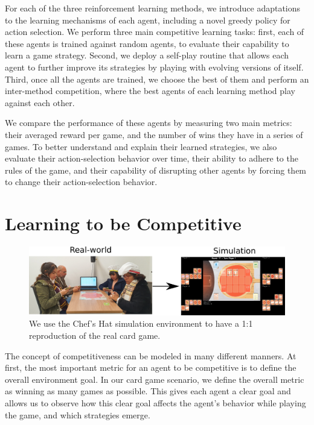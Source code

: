 \documentclass[a4paper,conference]{IEEEtran}
\begin{document}
For each of the three reinforcement learning methods, we introduce adaptations to the learning mechanisms of each agent, including a novel greedy policy for action selection. We perform three main competitive learning tasks: first, each of these agents is trained against random agents, to evaluate their capability to learn a game strategy. Second, we deploy a self-play routine that allows each agent to further improve its strategies by playing with evolving versions of itself. Third, once all the agents are trained, we choose the best of them and perform an inter-method competition, where the best agents of each learning method play against each other.

We compare the performance of these agents by measuring two main metrics: their averaged reward per game, and the number of wins they have in a series of games. To better understand and explain their learned strategies, we also evaluate their action-selection behavior over time, their ability to adhere to the rules of the game, and their capability of disrupting other agents by forcing them to change their action-selection behavior.


\section{Learning to be Competitive}

\begin{figure}
\begin{center}
  \includegraphics[width=1\linewidth]{realWorld-Simulation.png}
\end{center}
  \caption{We use the Chef's Hat simulation environment \cite{barros2020chef} to have a 1:1 reproduction of the real card game.}
\label{fig:gameExample}
\end{figure}

The concept of competitiveness can be modeled in many different manners. At first, the most important metric for an agent to be competitive is to define the overall environment goal. In our card game scenario, we define the overall metric as winning as many games as possible. This gives each agent a clear goal and allows us to observe how this clear goal affects the agent's behavior while playing the game, and which strategies emerge.
\end{document}
